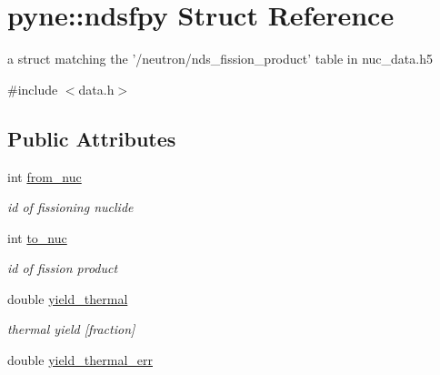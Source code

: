 \hypertarget{structpyne_1_1ndsfpy}{\section{pyne\+:\+:ndsfpy Struct Reference}
\label{structpyne_1_1ndsfpy}
}


a struct matching the '/neutron/nds\+\_\+fission\+\_\+product' table in nuc\+\_\+data.\+h5  




{\ttfamily \#include $<$data.\+h$>$}

\subsection*{Public Attributes}
\begin{DoxyCompactItemize}
\item 
\hypertarget{structpyne_1_1ndsfpy_ad2cb8c35a387624f95c5318f259834db}{int \hyperlink{structpyne_1_1ndsfpy_ad2cb8c35a387624f95c5318f259834db}{from\+\_\+nuc}}\label{structpyne_1_1ndsfpy_ad2cb8c35a387624f95c5318f259834db}

\begin{DoxyCompactList}\small\item\em id of fissioning nuclide \end{DoxyCompactList}\item 
\hypertarget{structpyne_1_1ndsfpy_aeabd96ca1b30be7381853ca0ccd75f31}{int \hyperlink{structpyne_1_1ndsfpy_aeabd96ca1b30be7381853ca0ccd75f31}{to\+\_\+nuc}}\label{structpyne_1_1ndsfpy_aeabd96ca1b30be7381853ca0ccd75f31}

\begin{DoxyCompactList}\small\item\em id of fission product \end{DoxyCompactList}\item 
\hypertarget{structpyne_1_1ndsfpy_a802ebba1436e6e7ca9595e77698310e8}{double \hyperlink{structpyne_1_1ndsfpy_a802ebba1436e6e7ca9595e77698310e8}{yield\+\_\+thermal}}\label{structpyne_1_1ndsfpy_a802ebba1436e6e7ca9595e77698310e8}

\begin{DoxyCompactList}\small\item\em thermal yield \mbox{[}fraction\mbox{]} \end{DoxyCompactList}\item 
\hypertarget{structpyne_1_1ndsfpy_affaf73e5d64d7e9e94f63c6807b7b17e}{double \hyperlink{structpyne_1_1ndsfpy_affaf73e5d64d7e9e94f63c6807b7b17e}{yield\+\_\+thermal\+\_\+err}}\label{structpyne_1_1ndsfpy_affaf73e5d64d7e9e94f63c6807b7b17e}


\end{DoxyCompactItemize}

